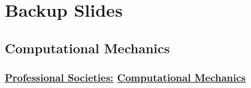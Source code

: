 % 

\section{Backup Slides}
\subsection{Computational Mechanics}

\begin{frame}\frametitle{\href{https://en.wikipedia.org/wiki/Computational_mechanics}{Professional Societies:} \href{https://en.wikipedia.org/wiki/Computational_mech}{Computational Mechanics}}
\center
\end{frame}


\endinput  %
